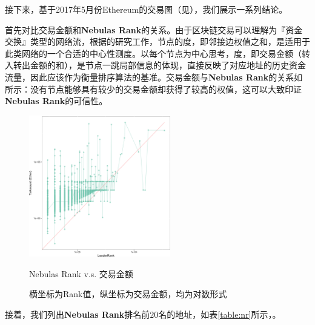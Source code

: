 接下来，基于2017年5月份Ethereum的交易图（见），我们展示一系列结论。

首先对比交易金额和\textbf{Nebulas Rank}的关系。由于区块链交易可以理解为『资金交换』类型的网络流，根据\textcite{Borgatti2005}的研究工作，节点的度，即邻接边权值之和，是适用于此类网络的一个合适的中心性测度。以每个节点为中心思考，度，即交易金额（转入转出金额的和），是节点一跳局部信息的体现，直接反映了对应地址的历史资金流量，因此应该作为衡量排序算法的基准。交易金额与\textbf{Nebulas Rank}的关系如所示：没有节点能够具有较少的交易金额却获得了较高的权值，这可以大致印证\textbf{Nebulas Rank}的可信性。

\begin{figure}[h]
	\centering
	\includegraphics[width=0.55\textwidth]{figs/nrio.png}
	\caption{Nebulas Rank v.s. 交易金额}\label{fig:nrio}
	\caption*{\footnotesize{横坐标为Rank值，纵坐标为交易金额，均为对数形式}}
\end{figure}

接着，我们列出\textbf{Nebulas Rank}排名前$20$名的地址，如表\ref{table:nr}所示，。

